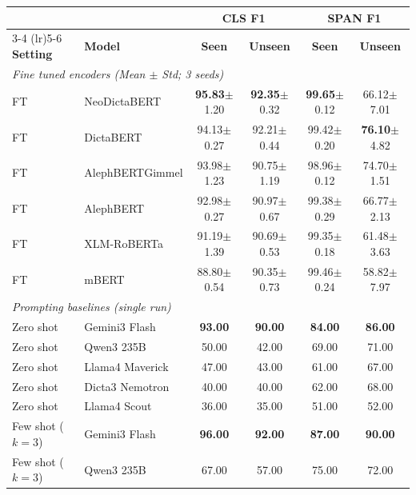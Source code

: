 \documentclass[11pt, a4paper]{report}
\renewcommand{\footnotesize}{\fontsize{10}{12}\selectfont}
\begin{document}
\begin{table}[H]
\centering
\footnotesize
\setlength{\tabcolsep}{4pt}
\renewcommand{\arraystretch}{1.15}
\begin{tabularx}{\linewidth}{@{}l X c c c c@{}}
\toprule
 &  & \multicolumn{2}{c}{\textbf{CLS F1}} & \multicolumn{2}{c}{\textbf{SPAN F1}} \\
\cmidrule(lr){3-4} \cmidrule(lr){5-6}
\textbf{Setting} & \textbf{Model} & \textbf{Seen} & \textbf{Unseen} & \textbf{Seen} & \textbf{Unseen} \\
\midrule
\multicolumn{6}{l}{\textit{Fine tuned encoders (Mean $\pm$ Std; 3 seeds)}} \\[2pt]
FT & NeoDictaBERT & \textbf{95.83}\scriptsize{$\pm$1.20} & \textbf{92.35}\scriptsize{$\pm$0.32} & \textbf{99.65}\scriptsize{$\pm$0.12} & 66.12\scriptsize{$\pm$7.01} \\
FT & DictaBERT & 94.13\scriptsize{$\pm$0.27} & 92.21\scriptsize{$\pm$0.44} & 99.42\scriptsize{$\pm$0.20} & \textbf{76.10}\scriptsize{$\pm$4.82} \\
FT & AlephBERTGimmel & 93.98\scriptsize{$\pm$1.23} & 90.75\scriptsize{$\pm$1.19} & 98.96\scriptsize{$\pm$0.12} & 74.70\scriptsize{$\pm$1.51} \\
FT & AlephBERT & 92.98\scriptsize{$\pm$0.27} & 90.97\scriptsize{$\pm$0.67} & 99.38\scriptsize{$\pm$0.29} & 66.77\scriptsize{$\pm$2.13} \\
FT & XLM-RoBERTa & 91.19\scriptsize{$\pm$1.39} & 90.69\scriptsize{$\pm$0.53} & 99.35\scriptsize{$\pm$0.18} & 61.48\scriptsize{$\pm$3.63} \\
FT & mBERT & 88.80\scriptsize{$\pm$0.54} & 90.35\scriptsize{$\pm$0.73} & 99.46\scriptsize{$\pm$0.24} & 58.82\scriptsize{$\pm$7.97} \\
\midrule
\multicolumn{6}{l}{\textit{Prompting baselines (single run)}} \\[2pt]
Zero shot & Gemini3 Flash & \textbf{93.00} & \textbf{90.00} & \textbf{84.00} & \textbf{86.00} \\
Zero shot & Qwen3 235B & 50.00 & 42.00 & 69.00 & 71.00 \\
Zero shot & Llama4 Maverick & 47.00 & 43.00 & 61.00 & 67.00 \\
Zero shot & Dicta3 Nemotron & 40.00 & 40.00 & 62.00 & 68.00 \\
Zero shot & Llama4 Scout & 36.00 & 35.00 & 51.00 & 52.00 \\
Few shot ($k{=}3$) & Gemini3 Flash & \textbf{96.00} & \textbf{92.00} & \textbf{87.00} & \textbf{90.00} \\
Few shot ($k{=}3$) & Qwen3 235B & 67.00 & 57.00 & 75.00 & 72.00 \\

\end{tabularx}
\end{table}
\end{document}
